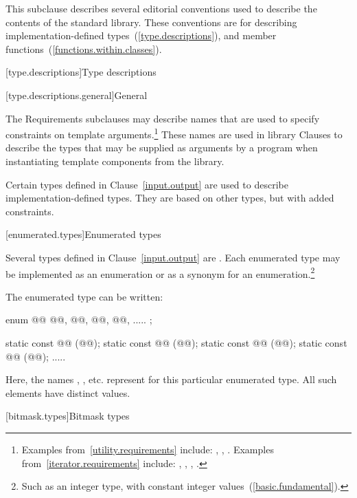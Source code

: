 \pnum
This subclause describes several editorial conventions used to describe the contents
of the \Cpp standard library.
These conventions are for describing
implementation-defined types~(\ref{type.descriptions}),
and member functions~(\ref{functions.within.classes}).

[type.descriptions]{Type descriptions}

[type.descriptions.general]{General}

\pnum
The Requirements subclauses may describe names that are used to specify
constraints on template arguments.\footnote{Examples
from~\ref{utility.requirements} include:
,
,
.
Examples from~\ref{iterator.requirements} include:
,
,
,
.}
These names are used in library Clauses
to describe the types that
may be supplied as arguments by a \Cpp program when instantiating template components from
the library.

\pnum
Certain types defined in Clause~\ref{input.output} are used to describe implementation-defined types.
%
They are based on other types, but with added constraints.

[enumerated.types]{Enumerated types}

\pnum
Several types defined in Clause~\ref{input.output} are
.
%
Each enumerated type may be implemented as an enumeration or as a synonym for
an enumeration.\footnote{Such as an integer type, with constant integer
values~(\ref{basic.fundamental}).}

\pnum
The enumerated type  can be written:

\begin{codeblock}
enum @@ { @@, @@, @@, @@, ..... };

static const @@ (@@);
static const @@ (@@);
static const @@ (@@);
static const @@ (@@);
  .....
\end{codeblock}

\pnum
Here, the names , , etc. represent
for this particular enumerated type.
%
All such elements have distinct values.

[bitmask.types]{Bitmask types}


